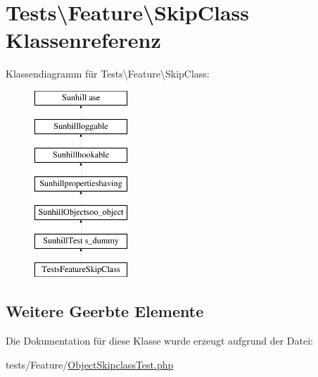 \hypertarget{classTests_1_1Feature_1_1SkipClass}{}\section{Tests\textbackslash{}Feature\textbackslash{}Skip\+Class Klassenreferenz}
\label{classTests_1_1Feature_1_1SkipClass}
Klassendiagramm für Tests\textbackslash{}Feature\textbackslash{}Skip\+Class\+:\begin{figure}[H]
\begin{center}
\leavevmode
\includegraphics[height=7.000000cm]{d2/da0/classTests_1_1Feature_1_1SkipClass}
\end{center}
\end{figure}
\subsection*{Weitere Geerbte Elemente}


Die Dokumentation für diese Klasse wurde erzeugt aufgrund der Datei\+:\begin{DoxyCompactItemize}
\item 
tests/\+Feature/\hyperlink{ObjectSkipclassTest_8php}{Object\+Skipclass\+Test.\+php}\end{DoxyCompactItemize}
